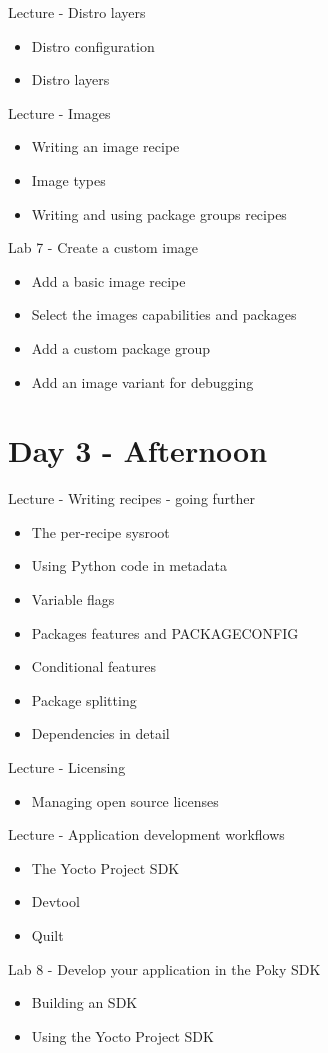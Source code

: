 \documentclass[a4paper,12pt,obeyspaces,spaces,hyphens]{article}
\begin{document}
\feagendaonecolumn
{Lecture - Distro layers}
{
  \begin{itemize}
  \item Distro configuration
  \item Distro layers
  \end{itemize}
}

\feagendatwocolumn
{Lecture - Images}
{
  \begin{itemize}
  \item Writing an image recipe
  \item Image types
  \item Writing and using package groups recipes
  \end{itemize}
}
{Lab 7 - Create a custom image}
{
  \begin{itemize}
  \item Add a basic image recipe
  \item Select the images capabilities and packages
  \item Add a custom package group
  \item Add an image variant for debugging
  \end{itemize}
}

\section{Day 3 - Afternoon}

\feagendatwocolumn
{Lecture - Writing recipes - going further}
{
  \begin{itemize}
  \item The per-recipe sysroot
  \item Using Python code in metadata
  \item Variable flags
  \item Packages features and PACKAGECONFIG
  \item Conditional features
  \item Package splitting
  \item Dependencies in detail
  \end{itemize}
}
{Lecture - Licensing}
{
  \begin{itemize}
  \item Managing open source licenses
  \end{itemize}
}

\feagendatwocolumn
{Lecture - Application development workflows}
{
  \begin{itemize}
  \item The Yocto Project SDK
  \item Devtool
  \item Quilt
  \end{itemize}
}
{Lab 8 - Develop your application in the Poky SDK}
{
  \begin{itemize}
  \item Building an SDK
  \item Using the Yocto Project SDK
  \end{itemize}
}
\end{document}
